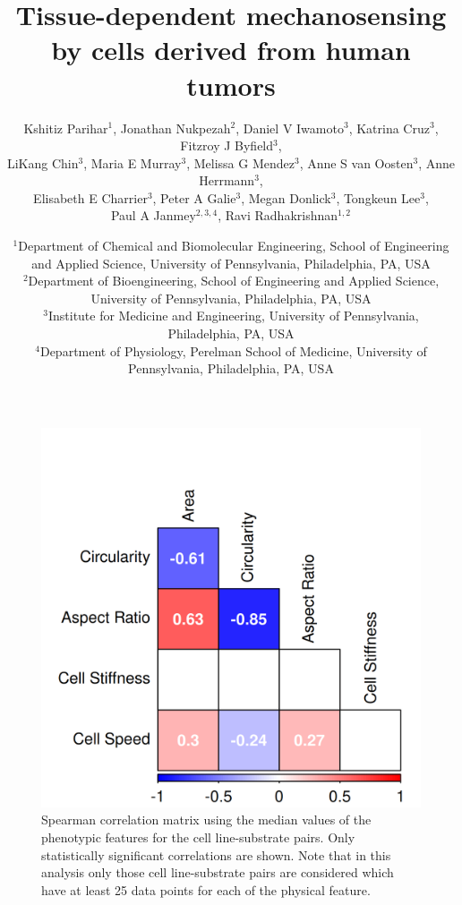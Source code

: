 \documentclass[11pt,letterpaper,english,oneside]{article} %
\author{Kshitiz Parihar$^1$, 
Jonathan Nukpezah$^2$, 
Daniel V Iwamoto$^3$, 
Katrina Cruz$^3$, 
Fitzroy J Byfield$^3$, \\
LiKang Chin$^3$, 
Maria E Murray$^3$, 
Melissa G Mendez$^3$, 
Anne S van Oosten$^3$, 
Anne Herrmann$^3$, \\
Elisabeth E Charrier$^3$, 
Peter A Galie$^3$, 
Megan Donlick$^3$, 
Tongkeun Lee$^3$, \\
Paul A Janmey$^{2,3,4}$, 
Ravi Radhakrishnan$^{1,2}$
}
\title{Tissue-dependent mechanosensing by cells derived from human tumors}
\date{%
    $^1$Department of Chemical and Biomolecular Engineering, School of Engineering and Applied Science, University of Pennsylvania, Philadelphia, PA, USA \\
    $^2$Department of Bioengineering, School of Engineering and Applied Science, University of Pennsylvania, Philadelphia, PA, USA \\
    $^3$Institute for Medicine and Engineering, University of Pennsylvania, Philadelphia, PA, USA \\
    $^4$Department of Physiology, Perelman School of Medicine, University of Pennsylvania, Philadelphia, PA, USA \\
}
\begin{document}
\renewcommand{\figurename}{Supplementary Figure}

\maketitle







\clearpage
\begin{figure}
    \centering
    \includegraphics[scale=0.8]{../Figures/supplementary_figure1.png}
    \caption{Spearman correlation matrix using the median values of the phenotypic features for the cell line-substrate pairs. Only statistically significant correlations are shown.
    Note that in this analysis only those cell line-substrate pairs are considered which have at least 25 data points for each of the physical feature.}
    \label{fig:fig1}
\end{figure}
\end{document}

